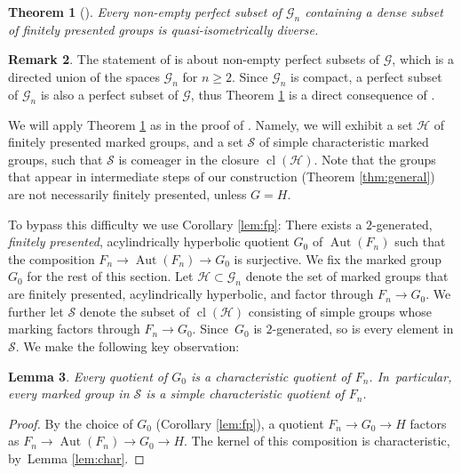 \documentclass[JEP,XML,SOM,Unicode]{cedram}
\newtheorem{theorem}{Theorem}[section]
\newtheorem{lemma}[theorem]{Lemma}
\theoremstyle{definition}
\newtheorem{remark}[theorem]{Remark}
\newcommand{\Aut}{\operatorname{Aut}}
\newcommand{\cl}{\operatorname{cl}}
\newcommand{\Gn}{\mathcal{G}_n}
\begin{document}
\begin{theorem}[{\cite[Cor.\,1.2]{diversity}}]
\label{thm:diversity:criterion}
Every non-empty perfect subset of $\Gn$ containing a dense subset of finitely presented groups is quasi-isometrically diverse.
\end{theorem}

\begin{remark}
The statement of \cite[Cor.\,1.2]{diversity} is about non-empty perfect subsets of $\mathcal{G}$, which is a directed union of the spaces $\Gn$ for $n \geq 2$. Since $\Gn$ is compact, a perfect subset of $\Gn$ is also a perfect subset of $\mathcal{G}$, thus Theorem \ref{thm:diversity:criterion} is a direct consequence of \cite[Cor.\,1.2]{diversity}.
\end{remark}

We will apply Theorem \ref{thm:diversity:criterion} as in the proof of \cite[Cor.\,4.10]{diversity}. Namely, we will exhibit a set $\mathcal{H}$ of finitely presented marked groups, and a set $\mathcal{S}$ of simple characteristic marked groups, such that $\mathcal{S}$ is comeager in the closure $\cl(\mathcal{H})$.
Note that the groups that appear in intermediate steps of our construction (Theorem \ref{thm:general}) are not necessarily finitely presented, unless $G = H$.

To bypass this difficulty we use Corollary \ref{lem:fp}: There exists a $2$-generated, \emph{finitely presented}, acylindrically hyperbolic quotient $G_0$ of $\Aut(F_n)$ such that the composition $F_n \to \Aut(F_n) \to G_0$ is surjective.
We fix the marked group $G_0$ for the rest of this section. Let $\mathcal{H} \subset \Gn$ denote the set of marked groups that are finitely presented, acylindrically hyperbolic, and factor through $F_n \to G_0$.
We further let $\mathcal{S}$ denote the subset of $\cl(\mathcal{H})$ consisting of simple groups whose marking factors through \hbox{$F_n \!\to\! G_0$}.
Since~$G_0$ is $2$-generated, so is every element in $\mathcal S$.
We make the following key observation:

\begin{lemma}
\label{lem:factor:char}
Every quotient of $G_0$ is a characteristic quotient of $F_n$. In~particular, every marked group in $\mathcal{S}$ is a simple characteristic quotient of $F_n$.
\end{lemma}

\begin{proof}
By the choice of $G_0$ (Corollary \ref{lem:fp}), a quotient $F_n \to G_0 \to H$ factors as $F_n \to \Aut(F_n) \to G_0 \to H$. The kernel of this composition is characteristic, by~Lemma \ref{lem:char}.
\end{proof}
\end{document}
